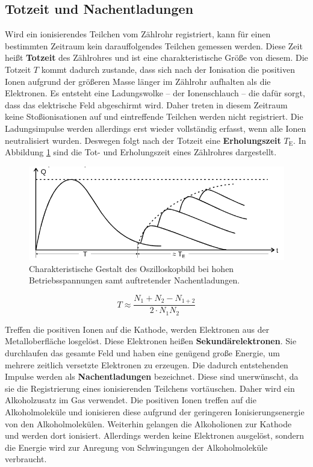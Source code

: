 \subsection{Totzeit und Nachentladungen}
Wird ein ionisierendes Teilchen vom Zählrohr registriert, kann für einen bestimmten Zeitraum
kein darauffolgendes Teilchen gemessen werden.
Diese Zeit heißt \textbf{Totzeit} des Zählrohres und ist eine charakteristische Größe von diesem.
Die Totzeit $T$ kommt dadurch zustande, dass sich nach der Ionisation die positiven Ionen 
aufgrund der größeren Masse länger im Zählrohr aufhalten als die Elektronen.
Es entsteht eine Ladungswolke -- der Ionenschlauch -- die dafür sorgt, dass das elektrische Feld
abgeschirmt wird. Daher treten in diesem Zeitraum keine Stoßionisationen auf und eintreffende 
Teilchen werden nicht registriert.
Die Ladungsimpulse werden allerdings erst wieder vollständig erfasst, wenn alle Ionen neutralisiert
wurden. Deswegen folgt nach der Totzeit eine \textbf{Erholungszeit} $T_{\mathrm{E}}$.
In Abbildung \ref{fig:nachladen} sind die Tot- und Erholungszeit eines Zählrohres dargestellt.
\begin{figure}
  \centering
  \includegraphics[width=\textwidth]{Bilder/erholzeit.png}
  \caption{Charakteristische Gestalt des Oszilloskopbild bei hohen Betriebsspannungen samt auftretender Nachentladungen. \cite{Anleitung}}
  \label{fig:nachladen}
\end{figure}
\begin{equation}
  \label{eqn:totzeit}
  T \approx \frac{N_1+N_2-N_{1+2}}{2\cdot N_1N_2}
\end{equation}

Treffen die positiven Ionen auf die Kathode, werden Elektronen aus der Metalloberfläche 
losgelöst. Diese Elektronen heißen \textbf{Sekundärelektronen}. Sie durchlaufen das gesamte
Feld und haben eine genügend große Energie, um mehrere zeitlich versetzte Elektronen 
zu erzeugen. Die dadurch entstehenden Impulse werden als \textbf{Nachentladungen} bezeichnet.
Diese sind unerwünscht, da sie die Registrierung eines ionisierenden Teilchens vortäuschen.
Daher wird ein Alkoholzusatz im Gas verwendet. Die positiven Ionen treffen auf die 
Alkoholmoleküle und ionisieren diese aufgrund der geringeren Ionisierungsenergie von den 
Alkoholmolekülen. Weiterhin gelangen die Alkoholionen zur Kathode und werden dort ionisiert.
Allerdings werden keine Elektronen ausgelöst, sondern die Energie wird zur Anregung von 
Schwingungen der Alkoholmoleküle verbraucht.
\FloatBarrier
